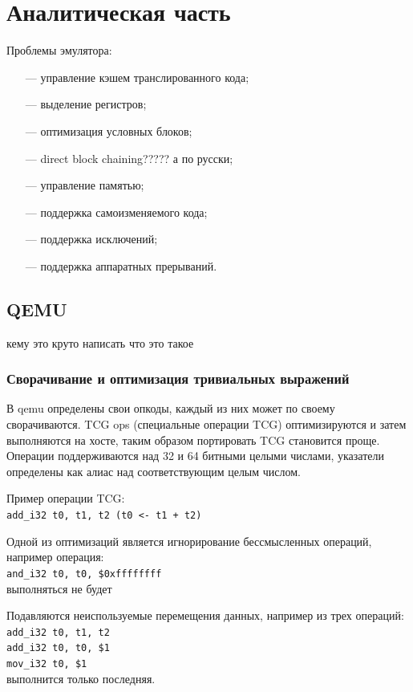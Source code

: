 \section{Аналитическая часть}

Проблемы эмулятора:
\begin{itemize}[leftmargin=1.6\parindent]
	\item[---] управление кэшем транслированного кода;
	\item[---] выделение регистров;
	\item[---] оптимизация условных блоков;
	\item[---] direct block chaining????? а по русски;
	\item[---] управление памятью;
	\item[---] поддержка самоизменяемого кода;
	\item[---] поддержка исключений;
	\item[---] поддержка аппаратных прерываний.
\end{itemize}

\subsection{QEMU}

кему это круто написать что это такое \cite{qemu}

\subsubsection{Сворачивание и оптимизация тривиальных выражений}

В qemu определены свои опкоды, каждый из них может по своему сворачиваются. TCG ops (специальные операции TCG) оптимизируются и затем выполняются на хосте, таким образом портировать TCG становится проще. Операции поддерживаются над 32 и 64 битными целыми числами, указатели определены как алиас над соответствующим целым числом.

Пример операции TCG:\\
\texttt{add\_i32 t0, t1, t2  (t0 <- t1 + t2)}

Одной из оптимизаций является игнорирование бессмысленных операций, например операция:\\
\texttt{and\_i32 t0, t0, \$0xffffffff\\}
выполняться не будет

Подавляются неиспользуемые перемещения данных, например из трех операций:\\
\texttt{add\_i32 t0, t1, t2\\
add\_i32 t0, t0, \$1\\
mov\_i32 t0, \$1\\}
выполнится только последняя.

